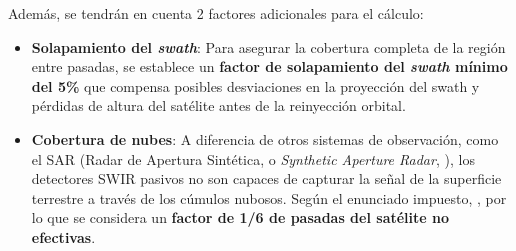 Además, se tendrán en cuenta 2 factores adicionales para el cálculo:
\begin{itemize}
    \item \textbf{Solapamiento del \textit{swath}}: Para asegurar la cobertura completa de la región entre pasadas, se establece un \textbf{factor de solapamiento del \textit{swath} mínimo del 5\%} que compensa posibles desviaciones en la proyección del swath y pérdidas de altura del satélite antes de la reinyección orbital.
    \item \textbf{Cobertura de nubes}: A diferencia de otros sistemas de observación, como el SAR (Radar de Apertura Sintética, o \textit{Synthetic Aperture Radar}, \cite{lou2020sar}), los detectores SWIR pasivos no son capaces de capturar la señal de la superficie terrestre a través de los cúmulos nubosos. Según el enunciado impuesto, , por lo que se considera un \textbf{factor de 1/6 de pasadas del satélite no efectivas}.
\end{itemize}

